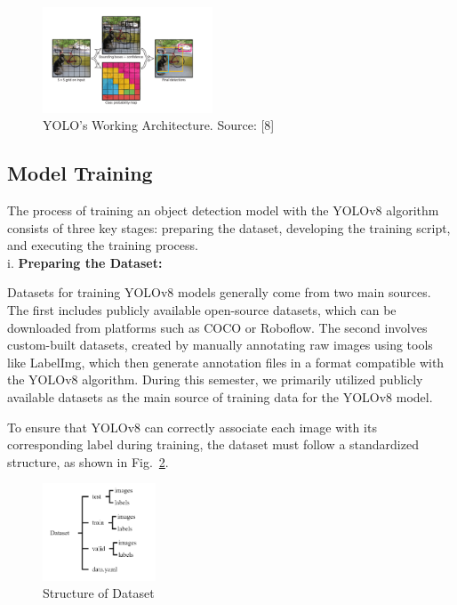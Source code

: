 \documentclass[journal,transmag]{IEEEtran}
\begin{document}
\begin{figure}[h]
    \centering
    \includegraphics[width=0.45\textwidth]{YOLO.png}
    \caption{YOLO's Working Architecture. Source: [8]}
    \label{fig:external_yolo}
\end{figure}

\subsection{Model Training}

The process of training an object detection model with the YOLOv8 algorithm consists of three key stages: preparing the dataset, developing the training script, and executing the training process.\\

i. \textbf{Preparing the Dataset: } 

Datasets for training YOLOv8 models generally come from two main sources. The first includes publicly available open-source datasets, which can be downloaded from platforms such as COCO or Roboflow. The second involves custom-built datasets, created by manually annotating raw images using tools like LabelImg, which then generate annotation files in a format compatible with the YOLOv8 algorithm. During this semester, we primarily utilized publicly available datasets as the main source of training data for the YOLOv8 model.

To ensure that YOLOv8 can correctly associate each image with its corresponding label during training, the dataset must follow a standardized structure, as shown in Fig.~\ref{fig:Structure of Dataset}. 

\begin{figure}[h]
    \centering
    \includegraphics[width=0.3\textwidth]{Structure of Dataset.png}
    \caption{Structure of Dataset}
    \label{fig:Structure of Dataset}
\end{figure}
\end{document}
